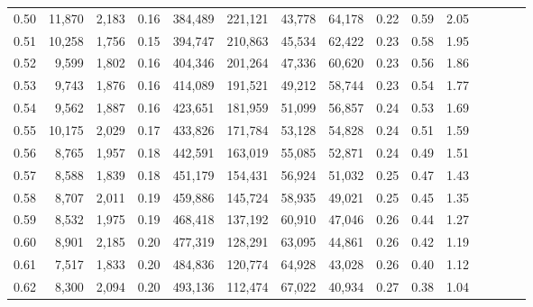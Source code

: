 \begin{tabular}{rrrcrrrrrrrrrrr}
0.50 &  11,870 &  2,183 &                                       0.16 &  384,489 &  221,121 &   43,778 &   64,178 &  0.22 &  0.59 &                         2.05 \\
0.51 &  10,258 &  1,756 &                                       0.15 &  394,747 &  210,863 &   45,534 &   62,422 &  0.23 &  0.58 &                         1.95 \\
0.52 &   9,599 &  1,802 &                                       0.16 &  404,346 &  201,264 &   47,336 &   60,620 &  0.23 &  0.56 &                         1.86 \\
0.53 &   9,743 &  1,876 &                                       0.16 &  414,089 &  191,521 &   49,212 &   58,744 &  0.23 &  0.54 &                         1.77 \\
0.54 &   9,562 &  1,887 &                                       0.16 &  423,651 &  181,959 &   51,099 &   56,857 &  0.24 &  0.53 &                         1.69 \\
0.55 &  10,175 &  2,029 &                                       0.17 &  433,826 &  171,784 &   53,128 &   54,828 &  0.24 &  0.51 &                         1.59 \\
0.56 &   8,765 &  1,957 &                                       0.18 &  442,591 &  163,019 &   55,085 &   52,871 &  0.24 &  0.49 &                         1.51 \\
0.57 &   8,588 &  1,839 &                                       0.18 &  451,179 &  154,431 &   56,924 &   51,032 &  0.25 &  0.47 &                         1.43 \\
0.58 &   8,707 &  2,011 &                                       0.19 &  459,886 &  145,724 &   58,935 &   49,021 &  0.25 &  0.45 &                         1.35 \\
0.59 &   8,532 &  1,975 &                                       0.19 &  468,418 &  137,192 &   60,910 &   47,046 &  0.26 &  0.44 &                         1.27 \\
0.60 &   8,901 &  2,185 &                                       0.20 &  477,319 &  128,291 &   63,095 &   44,861 &  0.26 &  0.42 &                         1.19 \\
0.61 &   7,517 &  1,833 &                                       0.20 &  484,836 &  120,774 &   64,928 &   43,028 &  0.26 &  0.40 &                         1.12 \\
0.62 &   8,300 &  2,094 &                                       0.20 &  493,136 &  112,474 &   67,022 &   40,934 &  0.27 &  0.38 &                         1.04 \\

\end{tabular}
